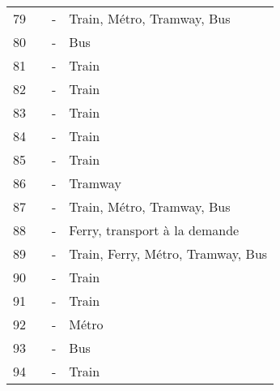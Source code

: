 \begin{longtable}{p{0.5cm}p{5.5cm}p{3cm}p{4cm}}
    \small{79} & \small{\textcite{pucher_integrating_2009}}\index{Pucher, John|pagebf} & \small{-} & \small{Train, Métro, Tramway, Bus}\\
    \small{80} & \small{\textcite{quarshie_integrating_2007}}\index{Quarshie, Magnus|pagebf} & \small{-} & \small{Bus}\\
    \small{81} & \small{\textcite{rastogi_willingness_2010}}\index{Rastogi, Rajat|pagebf} & \small{-} & \small{Train}\\
    \small{82} & \small{\textcite{rastogi_travel_2003}}\index{Rastogi, Rajat|pagebf} & \small{-} & \small{Train}\\
    \small{83} & \small{\textcite{ravensbergen_biking_2018}}\index{Ravensbergen, Léa|pagebf} & \small{-} & \small{Train}\\
    \small{84} & \small{\textcite{richer_service_2017}}\index{Richer, Cyprien|pagebf} & \small{-} & \small{Train}\\
    \small{85} & \small{\textcite{rietveld_accessibility_2000}}\index{Rietveld, Piet|pagebf} & \small{-} & \small{Train}\\
    \small{86} & \small{\textcite{rijsman_walking_2019}}\index{Rijsman, Lotte|pagebf} & \small{-} & \small{Tramway}\\
    \small{87} & \small{\textcite{risimati_spatial_2021}}\index{Risimati, Brightnes|pagebf} & \small{-} & \small{Train, Métro, Tramway, Bus}\\
    \small{88} & \small{\textcite{schneider_integration_2005}}\index{Schneider, Robert|pagebf} & \small{-} & \small{Ferry, transport à la demande}\\
    \small{89} & \small{\textcite{sebban_complementarite_2003}}\index{Sebban, Annie-Claude|pagebf} & \small{-} & \small{Train, Ferry, Métro, Tramway, Bus}\\
    \small{90} & \small{\textcite{shelat_analysing_2018}}\index{Shelat, Sanmay|pagebf} & \small{-} & \small{Train}\\
    \small{91} & \small{\textcite{sherwin_practices_2011}}\index{Sherwin, Henrietta|pagebf} & \small{-} & \small{Train}\\
    \small{92} & \small{\textcite{singleton_exploring_2014}}\index{Singleton, Patrick A.|pagebf} & \small{-} & \small{Métro}\\
    \small{93} & \small{\textcite{song_accessibility_2021}}\index{Song, Mingzhu|pagebf} & \small{-} & \small{Bus}\\
    \small{94} & \small{\textcite{staricco_implementing_2020}}\index{Staricco, Luca|pagebf} & \small{-} & \small{Train}\\

\end{longtable}
